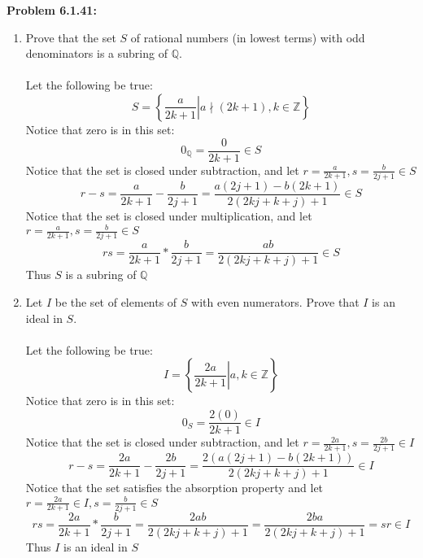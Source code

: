 \documentclass[12pt]{article}
\begin{document}
\newpage 

\noindent \textbf{Problem 6.1.41: }
	\begin{enumerate}[label = (\alph*)]
		\item Prove that the set $S$ of rational numbers (in lowest terms) with odd denominators is a subring of $\mathbb{Q}$.
		\\ \\
		Let the following be true:
			$$
			S = \left\{\left.\frac{a}{2k + 1} \right| a \nmid (2k + 1), k \in \mathbb{Z}\right\}
			$$
		Notice that zero is in this set:
			$$
			0_\mathbb{Q} = \frac{0}{2k + 1} \in S
			$$
		Notice that the set is closed under subtraction, and let $r = \frac{a}{2k + 1}, s = \frac{b}{2j + 1} \in S$
			$$
			r - s = \frac{a}{2k + 1} - \frac{b}{2j + 1} = \frac{a(2j + 1) - b(2k + 1)}{2(2kj + k + j) + 1} \in S
			$$ 
		Notice that the set is closed under multiplication, and let $r = \frac{a}{2k + 1}, s = \frac{b}{2j + 1} \in S$
			$$
			rs = \frac{a}{2k + 1} * \frac{b}{2j + 1} = \frac{ab}{2(2kj + k + j) + 1} \in S
			$$
		Thus $S$ is a subring of $\mathbb{Q}$
		\\
		\item Let $I$ be the set of elements of $S$ with even numerators. Prove that $I$ is an ideal in $S$.
		\\ \\
		 Let the following be true:
			 $$
			 I = \left\{\left.\frac{2a}{2k + 1} \right| a, k \in \mathbb{Z}\right\}
			 $$
		 Notice that zero is in this set:
			 $$
			 0_{S} = \frac{2(0)}{2k + 1} \in I
			 $$
		 Notice that the set is closed under subtraction, and let $r = \frac{2a}{2k + 1}, s = \frac{2b}{2j + 1} \in I$
		 	$$
		 	r - s = \frac{2a}{2k + 1} - \frac{2b}{2j + 1} = \frac{2(a(2j + 1) - b(2k + 1))}{2(2kj + k + j) + 1} \in I
		 	$$
		 Notice that the set satisfies the absorption property and let $r = \frac{2a}{2k + 1} \in I, s = \frac{b}{2j + 1} \in S$
		 	$$
		 	rs = \frac{2a}{2k + 1} * \frac{b}{2j + 1} = \frac{2ab}{2(2kj + k + j) + 1} = \frac{2ba}{2(2kj + k + j) + 1} = sr \in I
		 	$$
		 Thus $I$ is an ideal in $S$
	\end{enumerate}
\end{document}
